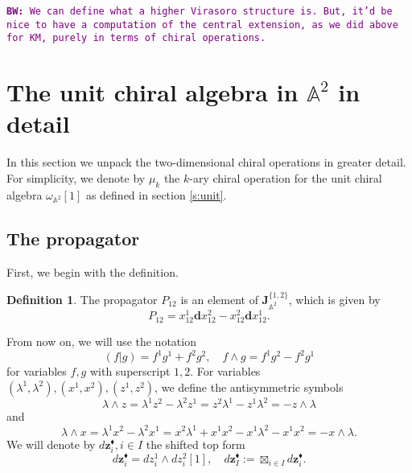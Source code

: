 \documentclass[11pt]{amsart}
\theoremstyle{definition}
\newtheorem{defn}[thm]{Definition}
\theoremstyle{remark}
\numberwithin{equation}{section}
\def\BW#1{{\textcolor{purple}{{\tt {\bf BW:} #1}}}}
\begin{document}
\BW{We can define what a higher Virasoro structure is. But, it'd be nice to have a computation of the central extension,
as we did above for KM, purely in terms of chiral operations.}

\section{The unit chiral algebra in $\mathbb{A}^2$ in detail}
\label{s:A2}

In this section we unpack the two-dimensional chiral operations in greater detail.
For simplicity, we denote by $\mu_k$ the $k$-ary chiral operation for the unit chiral algebra $\omega_{\mathbb{A}^2}[1]
$ as defined in section \ref{s:unit}.

\subsection{The propagator}
First, we begin with the definition.
\begin{defn}\label{dfn:prop}
    The propagator $P_{12}$ is an element of $\mathbf{J}^{\{1,2\}}_{\mathbb{A}^{2}}$, which is given by 
    $$
    P_{12}=x_{12}^1\mathbf{d}x_{12}^{2}-x_{12}^2\mathbf{d}x_{12}^{1}.
    $$
  \end{defn}

From now on, we will use the notation
$$
(f|g)=f^1g^1+f^2g^2,\quad f\wedge g=f^1g^2-f^2g^1
$$
for variables $f,g$ with superscript $1,2$. 
For variables $(\lambda^1,\lambda^2), (x^1,x^2), (z^1,z^2)$, we define the antisymmetric symbols
$$
\lambda\wedge z=\lambda^1z^2-\lambda^2z^1=z^2\lambda^1-z^1\lambda^2=-z\wedge\lambda
$$
and
$$
\lambda\wedge x=\lambda^1x^2-\lambda^2x^1=x^2\lambda^1+x^1x^2-x^1\lambda^2-x^1x^2=-x\wedge\lambda.
$$
We will denote by $d\mathbf{z}^{\blacklozenge}_i,i\in {I}$ the shifted top form
$$
d\mathbf{z}^{\blacklozenge}_i=dz_i^1\wedge dz^2_i[1],\quad d\mathbf{z}^{\blacklozenge}_I:=\boxtimes_{i\in I}d\mathbf{z}^{\blacklozenge}_i.
$$
\end{document}
